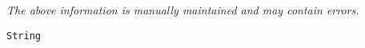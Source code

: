 \label{pkg:string}

{\tiny \it The above information is manually maintained and may contain errors.}
\begin{verbatim}
String
\end{verbatim}

